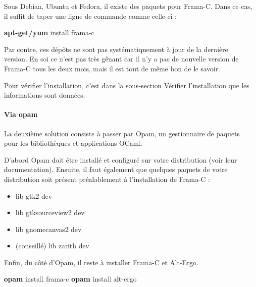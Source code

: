 \documentclass[12pt,francais,]{scrbook}
\newenvironment{Shaded}{}{}
\newcommand{\KeywordTok}[1]{\textcolor[rgb]{0.00,0.44,0.13}{\textbf{{#1}}}}
\newcommand{\NormalTok}[1]{{#1}}
\providecommand{\tightlist}{%
  \setlength{\itemsep}{0pt}\setlength{\parskip}{0pt}}
\begin{document}
Sous Debian, Ubuntu et Fedora, il existe des paquets pour Frama-C. Dans
ce cas, il suffit de taper une ligne de commande comme celle-ci :

\begin{footnotesize}\begin{Shaded}
\begin{Highlighting}[]
\KeywordTok{apt-get/yum} \NormalTok{install frama-c}
\end{Highlighting}
\end{Shaded}\end{footnotesize}

Par contre, ces dépôts ne sont pas systématiquement à jour de la
dernière version. En soi ce n'est pas très gênant car il n'y a pas de
nouvelle version de Frama-C tous les deux mois, mais il est tout de même
bon de le savoir.

Pour vérifier l'installation, c'est dans la sous-section \og{}Vérifier
l'installation\fg{} que les informations sont données.

\paragraph{Via opam}\label{via-opam}

La deuxième solution consiste à passer par Opam, un gestionnaire de
paquets pour les bibliothèques et applications OCaml.

D'abord Opam doit être installé et configuré sur votre distribution
(voir leur documentation). Ensuite, il faut également que quelques
paquets de votre distribution soit présent préalablement à
l'installation de Frama-C :

\begin{itemize}
\tightlist
\item
  lib gtk2 dev
\item
  lib gtksourceview2 dev
\item
  lib gnomecanvas2 dev
\item
  (conseillé) lib zarith dev
\end{itemize}

Enfin, du côté d'Opam, il reste à installer Frama-C et Alt-Ergo.

\begin{footnotesize}\begin{Shaded}
\begin{Highlighting}[]
\KeywordTok{opam} \NormalTok{install frama-c}
\KeywordTok{opam} \NormalTok{install alt-ergo}
\end{Highlighting}
\end{Shaded}\end{footnotesize}
\end{document}
